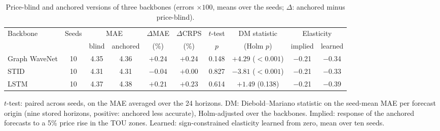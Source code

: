 \begin{table}[h]
\centering\footnotesize
\caption{Price-blind and anchored versions of three backbones (errors $\times100$, means over the seeds; $\Delta$: anchored minus price-blind).}
\label{tab:backbones}
\setlength{\tabcolsep}{4pt}
\begin{tabular}{lccccccccc}
\toprule
Backbone & Seeds & \multicolumn{2}{c}{MAE} & $\Delta$MAE & $\Delta$CRPS & $t$-test & DM statistic & \multicolumn{2}{c}{Elasticity} \\
\cmidrule(lr){3-4}\cmidrule(lr){9-10}
 & & blind & anchored & (\%) & (\%) & $p$ & (Holm $p$) & implied & learned \\
\midrule
Graph WaveNet & 10 & 4.35 & 4.36 & $+0.24$ & $+0.24$ & 0.148 & $+4.29$ ($<0.001$) & $-$0.21 & $-$0.34 \\
STID & 10 & 4.31 & 4.31 & $-0.04$ & $+0.00$ & 0.827 & $-3.81$ ($<0.001$) & $-$0.21 & $-$0.33 \\
LSTM & 10 & 4.37 & 4.38 & $+0.21$ & $+0.23$ & 0.614 & $+1.49$ (0.138) & $-$0.21 & $-$0.39 \\
\bottomrule
\end{tabular}
\par\smallskip\parbox{\linewidth}{\footnotesize $t$-test: paired across seeds, on the MAE averaged over the 24 horizons. DM: Diebold--Mariano statistic on the seed-mean MAE per forecast origin (nine stored horizons, positive: anchored less accurate), Holm-adjusted over the backbones. Implied: response of the anchored forecasts to a 5\% price rise in the TOU zones. Learned: sign-constrained elasticity learned from zero, mean over ten seeds.}
\end{table}
